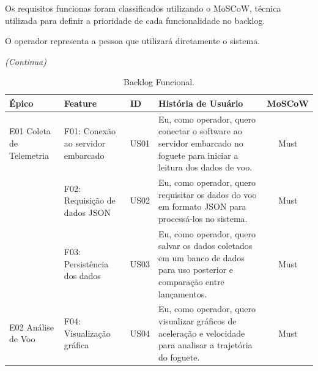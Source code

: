 Os requisitos funcionas foram classificados utilizando o MoSCoW, técnica utilizada para definir a prioridade de cada funcionalidade no backlog.

O operador representa a pessoa que utilizará diretamente o sistema.

\setlength{\extrarowheight}{2pt}

\begin{table}[H] 
    \caption{Backlog Funcional.}
    \label{tab:backlog_funcional}
    \hfill\textit{(Continua)}
    
    \centering
    \begin{tabular}{|p{2.5cm}|p{3.5cm}|l|p{5.5cm}|c|}
    \hline
    \textbf{Épico} & \textbf{Feature} & \textbf{ID} & \textbf{História de Usuário} & \textbf{MoSCoW} \\
    \hline
    E01 Coleta de Telemetria & F01: Conexão ao servidor embarcado & US01 & Eu, como operador, quero conectar o software ao servidor embarcado no foguete para iniciar a leitura dos dados de voo. & Must \\
    \cline{2-5}
    & F02: Requisição de dados JSON & US02 & Eu, como operador, quero requisitar os dados do voo em formato JSON para processá-los no sistema. & Must \\
    \cline{2-5}
    & F03: Persistência dos dados & US03 & Eu, como operador, quero salvar os dados coletados em um banco de dados para uso posterior e comparação entre lançamentos. & Must \\
    \hline
    E02 Análise de Voo & F04: Visualização gráfica & US04 & Eu, como operador, quero visualizar gráficos de aceleração e velocidade para analisar a trajetória do foguete. & Must \\
    \hline
    \end{tabular}
\end{table}

